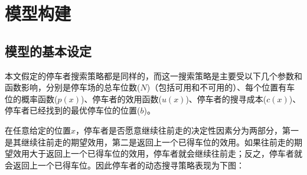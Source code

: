\documentclass{thuemp}
\begin{document}
\section{模型构建}
\subsection{模型的基本设定}
\par 本文假定的停车者搜索策略都是同样的，而这一搜索策略是主要受以下几个参数和函数影响，分别是停车场的总车位数($N$)（包括可用和不可用的）、每个位置有车位的概率函数($p(x)$)、停车者的效用函数($u(x)$)、停车者的搜寻成本($c(x)$)、停车者已经找到的最优停车位的位置($b$)。


\par 在任意给定的位置$x$，停车者是否愿意继续往前走的决定性因素分为两部分，第一是其继续往前走的期望效用，第二是返回上一个已得车位的效用。如果往前走的期望效用大于返回上一个已得车位的效用，停车者就会继续往前走；反之，停车者就会返回上一个已得车位。因此停车者的动态搜寻策略表现为下图：
\end{document}
